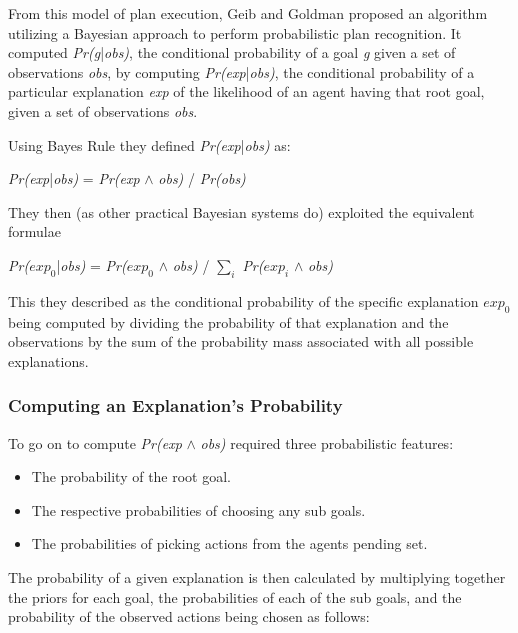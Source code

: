 \documentclass[parskip]{cs4rep}
\begin{document}
From this model of plan execution, Geib and Goldman proposed an algorithm utilizing a Bayesian approach to perform probabilistic plan recognition. It computed \textit{Pr(g}|\textit{obs)}, the conditional probability of a goal \textit{g} given a set of observations \textit{obs}, by computing \textit{Pr(exp}|\textit{obs)}, the conditional probability of a particular explanation \textit{exp} of the likelihood of an agent having that root goal, given a set of observations \textit{obs}.

Using Bayes Rule they defined \textit{Pr(exp}|\textit{obs)} as:\newline

\centerline{
\textit{Pr(exp}|\textit{obs)} = \textit{Pr(exp} $\wedge$ \textit{obs)} / \textit{Pr(obs)}
}

They then (as other practical Bayesian systems do) exploited the equivalent formulae\newline

\centerline{
\textit{Pr($exp_0$}|\textit{obs)} = \textit{Pr($exp_0$} $\wedge$ \textit{obs)} / $\displaystyle\sum\nolimits_{i}$ \textit{Pr($exp_i$} $\wedge$ \textit{obs)}
}

This they described as the conditional probability of the specific explanation $exp_0$ being computed by dividing the probability of that explanation and the observations by the sum of the probability mass associated with all possible explanations.

\subsubsection{Computing an Explanation's Probability}

To go on to compute \textit{Pr(exp} $\wedge$ \textit{obs)} required three probabilistic features:\newline

\begin{itemize}
\item
The probability of the root goal.
\item
The respective probabilities of choosing any sub goals.
\item
The probabilities of picking actions from the agents pending set.\newline
\end{itemize}

The probability of a given explanation is then calculated by multiplying together the priors for each goal, the probabilities of each of the sub goals, and the probability of the observed actions being chosen as follows:\newline
\end{document}
